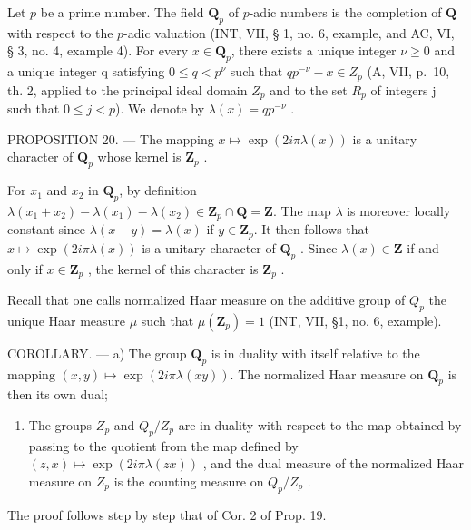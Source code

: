 Let \(p\) be a prime number. The field \(\mathbf{Q}_{p}\) of \(p\)-adic numbers is the completion of \(\mathbf{Q}\) with respect to the \(p\)-adic valuation (INT, VII, § 1, no. 6, example, and AC, VI, § 3, no. 4, example 4). For every \(x \in \mathbf{Q}_{p}\), there exists a unique integer \(\nu\geqslant0\) and a unique integer q satisfying \(0\leqslant q<p^{\nu}\) such that \(qp^{-\nu}-x\in Z_{p}\) (A, VII, p.~10, th. 2, applied to the principal ideal domain \(Z_{p}\) and to the set \(R_{p}\) of integers j such that \(0\leqslant j<p\)). We denote by \(\lambda(x)=qp^{-\nu}\) .

PROPOSITION 20. — The mapping \(x \mapsto \exp(2i\pi\lambda(x))\) is a unitary character of \(\mathbf{Q}_{p}\) whose kernel is \(\mathbf{Z}_{p}\) .

For \(x_1\) and \(x_2\) in \(\mathbf{Q}_p\), by definition \(\lambda(x_1 + x_2) - \lambda(x_1) - \lambda(x_2) \in \mathbf{Z}_p \cap \mathbf{Q} = \mathbf{Z}\). The map \(\lambda\) is moreover locally constant since \(\lambda(x + y) = \lambda(x)\) if \(y \in \mathbf{Z}_p\). It then follows that \(x \mapsto \exp(2i\pi\lambda(x))\) is a unitary character of \(\mathbf{Q}_p\) . Since \(\lambda(x) \in \mathbf{Z}\) if and only if \(x \in \mathbf{Z}_p\) , the kernel of this character is \(\mathbf{Z}_p\) .

Recall that one calls normalized Haar measure on the additive group of \(Q_{p}\) the unique Haar measure \(\mu\) such that \(\mu(\mathbf{Z}_{p}) = 1\) (INT, VII, §1, no. 6, example).

COROLLARY. --- a) The group \(\mathbf{Q}_{p}\) is in duality with itself relative to the mapping \((x,y)\mapsto\exp(2i\pi\lambda(xy))\). The normalized Haar measure on \(\mathbf{Q}_{p}\) is then its own dual;

\begin{enumerate}
\def\labelenumi{\alph{enumi})}
\setcounter{enumi}{1}
\tightlist
\item
  The groups \(Z_{p}\) and \(Q_{p}/Z_{p}\) are in duality with respect to the map obtained by passing to the quotient from the map defined by \((z,x)\mapsto\exp(2i\pi\lambda(zx))\) , and the dual measure of the normalized Haar measure on \(Z_{p}\) is the counting measure on \(Q_{p}/Z_{p}\) .
\end{enumerate}

The proof follows step by step that of Cor. 2 of Prop. 19.

